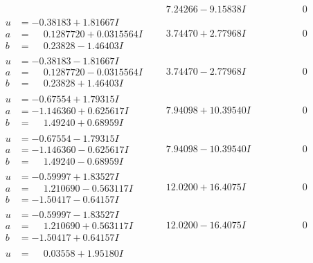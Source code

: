 \documentclass[1p]{elsarticle_modified}
\theoremstyle{definition}
\begin{document}
$$\begin{array}{c|c|c}
 & \phantom{-}7.24266 - 9.15838 I & \phantom{-0.000000 } 0 \\ \hline\begin{aligned}
u &= -0.38183 + 1.81667 I \\
a &= \phantom{-}0.1287720 + 0.0315564 I \\
b &= \phantom{-}0.23828 - 1.46403 I\end{aligned}
 & \phantom{-}3.74470 + 2.77968 I & \phantom{-0.000000 } 0 \\ \hline\begin{aligned}
u &= -0.38183 - 1.81667 I \\
a &= \phantom{-}0.1287720 - 0.0315564 I \\
b &= \phantom{-}0.23828 + 1.46403 I\end{aligned}
 & \phantom{-}3.74470 - 2.77968 I & \phantom{-0.000000 } 0 \\ \hline\begin{aligned}
u &= -0.67554 + 1.79315 I \\
a &= -1.146360 + 0.625617 I \\
b &= \phantom{-}1.49240 + 0.68959 I\end{aligned}
 & \phantom{-}7.94098 + 10.39540 I & \phantom{-0.000000 } 0 \\ \hline\begin{aligned}
u &= -0.67554 - 1.79315 I \\
a &= -1.146360 - 0.625617 I \\
b &= \phantom{-}1.49240 - 0.68959 I\end{aligned}
 & \phantom{-}7.94098 - 10.39540 I & \phantom{-0.000000 } 0 \\ \hline\begin{aligned}
u &= -0.59997 + 1.83527 I \\
a &= \phantom{-}1.210690 - 0.563117 I \\
b &= -1.50417 - 0.64157 I\end{aligned}
 & \phantom{-}12.0200 + 16.4075 I & \phantom{-0.000000 } 0 \\ \hline\begin{aligned}
u &= -0.59997 - 1.83527 I \\
a &= \phantom{-}1.210690 + 0.563117 I \\
b &= -1.50417 + 0.64157 I\end{aligned}
 & \phantom{-}12.0200 - 16.4075 I & \phantom{-0.000000 } 0 \\ \hline\begin{aligned}
u &= \phantom{-}0.03558 + 1.95180 I \\

\end{aligned}
\end{array}$$
\end{document}

